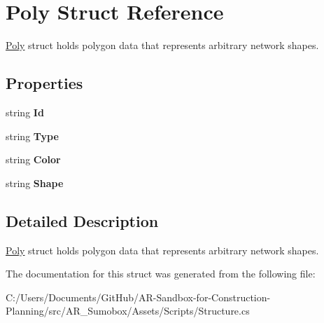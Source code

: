\hypertarget{struct_poly}{}\section{Poly Struct Reference}
\label{struct_poly}


\mbox{\hyperlink{struct_poly}{Poly}} struct holds polygon data that represents arbitrary network shapes.  


\subsection*{Properties}
\begin{DoxyCompactItemize}
\item 
\mbox{\label{struct_poly_a09c8abd39a08fde749f6fd274ecaf8b4}} 
string {\bfseries Id}
\item 
\mbox{\label{struct_poly_a287ce0d3159149957debdf570ee58f8c}} 
string {\bfseries Type}
\item 
\mbox{\label{struct_poly_a405ea9c676cb3b5b128ad5da14cdebb9}} 
string {\bfseries Color}
\item 
\mbox{\label{struct_poly_a592622ff86e90d1f6b8c9f99595aaead}} 
string {\bfseries Shape}
\end{DoxyCompactItemize}


\subsection{Detailed Description}
\mbox{\hyperlink{struct_poly}{Poly}} struct holds polygon data that represents arbitrary network shapes. 



The documentation for this struct was generated from the following file\+:\begin{DoxyCompactItemize}
\item 
C\+:/\+Users/\+Documents/\+Git\+Hub/\+A\+R-\/\+Sandbox-\/for-\/\+Construction-\/\+Planning/src/\+A\+R\+\_\+\+Sumobox/\+Assets/\+Scripts/Structure.\+cs\end{DoxyCompactItemize}
